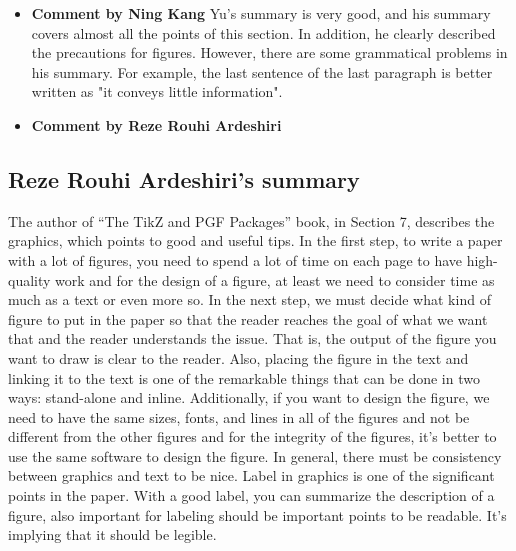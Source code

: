 \documentclass[paper=a4, fontsize=11pt]{scrartcl} %
\numberwithin{equation}{section} %
\numberwithin{figure}{section} %
\numberwithin{table}{section} %
\begin{document}
		\begin{itemize}
			\item \textbf{Comment by Ning Kang} \newline
				Yu's summary is very good, and his summary covers almost all the points of this section. In addition, he clearly described the precautions for figures. However, there are some grammatical problems in his summary. For example, the last sentence of the last paragraph is better written as "it conveys little information".
				
			\item \textbf{Comment by Reze Rouhi Ardeshiri} \newline
				
		\end{itemize}
		
	\subsection{Reze Rouhi Ardeshiri's summary}
		The author of “The TikZ and PGF Packages” book, in Section 7, describes the graphics, which points to good and useful tips.\newline
		In the first step, to write a paper with a lot of figures, you need to spend a lot of time on each page to have high-quality work and for the design of a figure, at least we need to consider time as much as a text or even more so.\newline
		In the next step, we must decide what kind of figure to put in the paper so that the reader reaches the goal of what we want that and the reader understands the issue. That is, the output of the figure you want to draw is clear to the reader.\newline
		Also, placing the figure in the text and linking it to the text is one of the remarkable things that can be done in two ways: stand-alone and inline.\newline
		Additionally, if you want to design the figure, we need to have the same sizes, fonts, and lines in all of the figures and not be different from the other figures and for the integrity of the figures, it's better to use the same software to design the figure. In general, there must be consistency between graphics and text to be nice.\newline
		Label in graphics is one of the significant points in the paper. With a good label, you can summarize the description of a figure, also important for labeling should be important points to be readable. It’s implying that it should be legible.\newline
\end{document}
